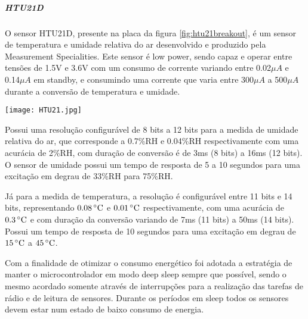 
\subparagraph{HTU21D} O sensor HTU21D, presente na placa da figura
\ref{fig:htu21breakout}, é um sensor de temperatura e umidade relativa do ar
desenvolvido e produzido pela Measurement Specialities. Este sensor é low
power, sendo capaz e operar entre tensões de 1.5V e 3.6V com um consumo de
corrente variando entre 0.02$\mu A$ e 0.14$\mu A$ em standby, e consumindo uma
corrente que varia entre 300$\mu A$ a 500$\mu A$ durante a conversão de
temperatura e umidade. \cite{HTU21DDatasheet}

\begin{center}
	\centering 
	\texttt{[image: HTU21.jpg]}
	\label{fig:htu21breakout}
\end{center} 

Possui uma  resolução configurável de 8 bits a 12 bits para a medida de umidade
relativa do ar, que corresponde a 0.7\%RH e 0.04\%RH respectivamente com uma
acurácia de 2\%RH, com duração de conversão é de 3ms (8 bits) a 16ms (12 bits).
O sensor de umidade possui um tempo de resposta de 5 a 10 segundos para uma
excitação em degrau de 33\%RH para 75\%RH. \cite{HTU21DDatasheet}

Já para a medida de temperatura, a resolução é configurável entre 11 bits e 14
bits, representando $0.08\,^{\circ}{\rm C}$ e $0.01\,^{\circ}{\rm C}$
respectivamente, com uma acurácia de $0.3\,^{\circ}{\rm C}$ e com duração da
conversão variando de 7ms (11 bits) a 50ms (14 bits). Possui um tempo de
resposta de 10 segundos para uma excitação em degrau de $15\,^{\circ}{\rm C}$ a
$45\,^{\circ}{\rm C}$.\cite{HTU21DDatasheet}

Com a finalidade de otimizar o consumo energético foi adotada a estratégia de
manter o microcontrolador em modo deep sleep sempre que possível, sendo o mesmo
acordado somente através de interrupções para a realização das tarefas de rádio
e de leitura de sensores. Durante os períodos em sleep todos os sensores devem
estar num estado de baixo consumo de energia.\cite{MicrochipLPDesign}

